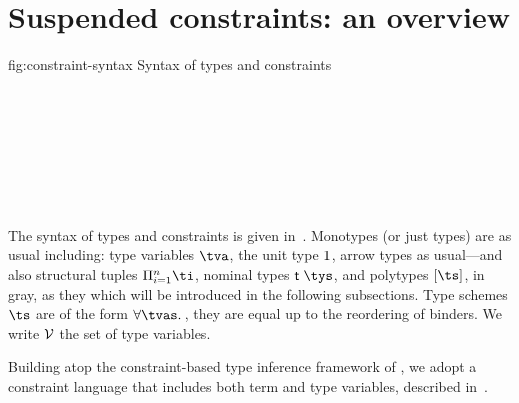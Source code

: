 \documentclass[acmsmall,screen,nonacm,review]{acmart}
\begin{document}
\section{Suspended constraints: an overview}
\label{sec:constraints}

\begin{bnffig}[t]%
  {fig:constraint-syntax}%
  {Syntax of types and constraints}
\\
\entry[Types]{\t}{
    \tv \and
    \tunit \and
    \ta \to \tb \color{gray} \and
    \Pi\iton \ti \and
    \T \tys \and
    \tpoly \ts
}\\
\\[1ex]
\entry[Constraints]{\c}{
        \ctrue
  \and  \cfalse
  \and  \ca \cand \cb
  \and  \cexists \tv \c
  \and 	\cfor \tv \c
  \and  \cunif \ta \tb
  \nextline
  \and  \clet \x \tv \ca \cb
  \and  \capp \x \t
  \nextline
  \and  \cmatch \t \cbrs
}\\[1ex]
\entry[Branches]{\cbr}{\cbranch \cpat \c} \\
\entry[Patterns]{\cpat}{}{} \\[1ex]
 \\
\entry[Shapes] {\Sh} {} {}
\\
 {} {}
\end{bnffig}


The syntax of types and constraints is given
in~. Monotypes (or just types) are as
usual including: type variables $\tv$, the unit type $1$, arrow
types as usual---and also structural tuples $\Pi\iton \ti$, nominal
types $\T \tys$, and polytypes $\tpoly \ts$, in gray, as they which
will be introduced in the following subsections.  Type schemes $\ts$
are of the form $\all \tvs \t$, they are equal up to the reordering of
binders. We write $\mathcal{V}$ the set of type variables.

Building atop the constraint-based type inference framework of
\citet{Pottier-Remy/emlti}, we adopt a constraint language that includes both
term and type variables, described in~.
\end{document}
